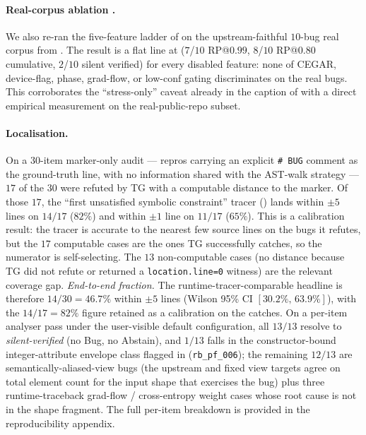 \paragraph{Real-corpus ablation
.}
We also re-ran the five-feature ladder of  on
the upstream-faithful $10$-bug real corpus from
. The result is a flat line at
($7$/$10$ RP@$0.99$, $8$/$10$ RP@$0.80$ cumulative,
$2$/$10$ silent verified) for every disabled feature: none of
CEGAR, device-flag, phase, grad-flow, or low-conf gating
discriminates on the real bugs. This corroborates the
``stress-only'' caveat already in the caption of
 with a direct empirical measurement on the
real-public-repo subset.

\paragraph{Localisation.}
On a $30$-item marker-only audit --- repros carrying an explicit
\texttt{\# BUG} comment as the ground-truth line, with no
information shared with the AST-walk strategy --- $17$ of the $30$
were refuted by \textsc{TG} with a computable distance to the
marker. Of those $17$, the ``first unsatisfied symbolic constraint''
tracer () lands within $\pm 5$ lines on
$14/17$ ($82\%$) and within $\pm 1$ line on $11/17$ ($65\%$).
This is a calibration result: the tracer is accurate to the nearest
few source lines on the bugs it refutes, but the $17$ computable
cases are the ones \textsc{TG} successfully catches, so the
numerator is self-selecting. The $13$ non-computable cases (no
distance because \textsc{TG} did not refute or returned a
\texttt{location.line=0} witness) are the relevant coverage gap.
\emph{End-to-end fraction.} The runtime-tracer-comparable headline
is therefore $14/30=46.7\%$ within $\pm 5$ lines (Wilson 95\% CI
$[30.2\%,\,63.9\%]$), with the $14/17=82\%$ figure retained as a
calibration on the catches.
On a per-item analyser pass under the user-visible default
configuration, all $13/13$ resolve to \emph{silent-verified}
(no Bug, no Abstain), and $1/13$ falls in the constructor-bound
integer-attribute envelope class flagged in 
(\texttt{rb\_pf\_006}); the remaining $12/13$ are
semantically-aliased-view bugs (the upstream and fixed view targets
agree on total element count for the input shape that exercises the
bug) plus three runtime-traceback grad-flow / cross-entropy
weight cases whose root cause is not in the shape fragment.
The full per-item breakdown is provided in the reproducibility appendix.

